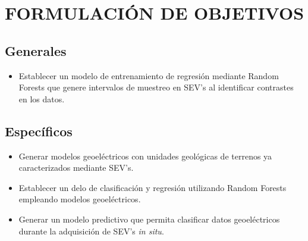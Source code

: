\chapter{FORMULACIÓN DE OBJETIVOS}

\section{Generales}

\begin{itemize}

	\item Establecer un modelo de entrenamiento de regresión mediante Random Forests que genere intervalos de muestreo en SEV's al identificar contrastes en los datos.
\end{itemize}

\section{Específicos}


\begin{itemize}
	\item Generar modelos geoeléctricos con unidades geológicas de terrenos ya caracterizados mediante SEV's.
	\item Establecer un delo de clasificación y regresión utilizando Random Forests empleando  modelos geoeléctricos.
	\item Generar un modelo predictivo que permita clasificar datos geoeléctricos durante la adquisición de SEV's \textit{in situ}.
	
\end{itemize}
